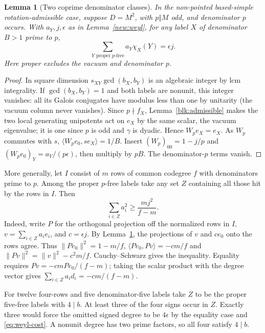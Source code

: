\documentclass[11pt]{amsart}
\numberwithin{equation}{section}
\newtheorem{lemma}[theorem]{Lemma}
\theoremstyle{definition}
\theoremstyle{plain}
\begin{document}
\begin{lemma}[Two coprime denominator classes]\label{new:cross-weyl}
In the non-pointed based-simple rotation-admissible case, suppose $D=M^2$, with $p\Vert M$ odd, and denominator $p$ occurs. With $a_Y,j,\epsilon$ as in Lemma~\ref{new:weyl}, for any label $X$ of denominator $B>1$ prime to $p$,
\[
         \sum_{Y\text{ proper }p\text{-free}}a_Y\chi_X(Y)=\epsilon j.
\]
Here proper excludes the vacuum and denominator $p$.
\end{lemma}
\begin{proof}
In square dimension $s_{XY}\gcd(b_X,b_Y)$ is an algebraic integer by lcm integrality. If $\gcd(b_X,b_Y)=1$ and both labels are nonunit, this integer vanishes: all its Galois conjugates have modulus less than one by unitarity (the vacuum column never vanishes). Since $p\nmid f_X$, Lemma~\ref{blk:admissible} makes the two local generating unipotents act on $e_X$ by the same scalar, the vacuum eigenvalue; it is one since $p$ is odd and $\gamma$ is dyadic. Hence $W_p e_X=e_X$. As $W_p$ commutes with $s$, $\langle W_pe_0,se_X\rangle=1/B$. Insert $(W_p)_{00}=1-j/p$ and $(W_pe_0)_Y=a_Y/(p\epsilon)$, then multiply by $pB$. The denominator-$p$ terms vanish.
\end{proof}

More generally, let $I$ consist of $m$ rows of common codegree $f$ with denominators prime to $p$. Among the proper $p$-free labels take any set $Z$ containing all those hit by the rows in $I$. Then
\[
                \sum_{i\in Z}a_i^2\ge\frac{mj^2}{f-m}.
\]
Indeed, write $P$ for the orthogonal projection off the normalized rows in $I$, $v=\sum_{i\in Z}a_ie_i$, and $c=\epsilon j$. By Lemma~\ref{new:cross-weyl}, the projections of $v$ and $ce_0$ onto the rows agree. Thus $\|Pe_0\|^2=1-m/f$, $\langle Pe_0,Pv\rangle=-cm/f$ and $\|Pv\|^2=\|v\|^2-c^2m/f$. Cauchy--Schwarz gives the inequality. Equality requires $Pv=-cmPe_0/(f-m)$; taking the scalar product with the degree vector gives $\sum_{i\in Z}a_id_i=-cm/(f-m)$.

For twelve four-rows and five denominator-five labels take $Z$ to be
the proper five-free labels with $4\mid b$. At least three of the four
signs occur in $Z$. Exactly three would force the omitted signed degree
to be $4\epsilon$ by the equality case and \eqref{eq:weyl-cost}.
A nonunit degree has two prime factors, so all four satisfy $4\mid b$.
\end{document}
